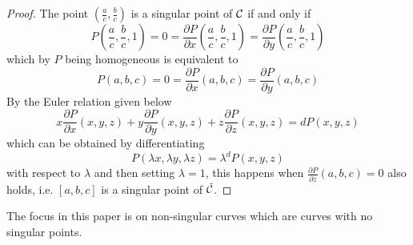 \begin{proof}
    The point $\left(\frac{a}{c},\frac{b}{c}\right)$ is a singular point of $\mathcal C$ if and only if $$P\left(\frac{a}{c},\frac{b}{c},1\right)=0=\frac{\partial P}{\partial x}\left(\frac{a}{c},\frac{b}{c},1\right)=\frac{\partial P}{\partial y}\left(\frac{a}{c},\frac{b}{c},1\right)$$
    which by $P$ being homogeneous is equivalent to
    $$P(a,b,c)=0=\frac{\partial P}{\partial x}(a,b,c)=\frac{\partial P}{\partial y}(a,b,c)$$
    By the Euler relation given below
    $$x\frac{\partial P}{\partial x}(x,y,z)+y\frac{\partial P}{\partial y}(x,y,z)+z\frac{\partial P}{\partial z}(x,y,z)=dP(x,y,z)$$
    which can be obtained by differentiating
    $$P(\lambda x,\lambda y,\lambda z)=\lambda^dP(x,y,z)$$
    with respect to $\lambda$ and then setting $\lambda=1$, this happens when $\frac{\partial P}{\partial z}(a,b,c)=0$ also holds, i.e. $[a,b,c]$ is a singular point of $\tilde{\mathcal C}$.
\end{proof}

The focus in this paper is on non-singular curves which are curves with no singular points.
